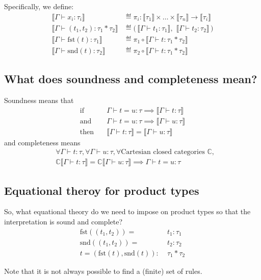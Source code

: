 Specifically, we define:
\begin{align*}
    \llbracket \Gamma \vdash x_i : \tau_i \rrbracket &\eqdef
    \pi_i : \llbracket \tau_1 \rrbracket \times \ldots \times \llbracket \tau_n
    \rrbracket \rightarrow \llbracket \tau_i \rrbracket
    \\
    \llbracket \Gamma \vdash (t_1, t_2) : \tau_1 \ast \tau_2 \rrbracket &\eqdef
    \big(\,\llbracket \Gamma \vdash t_1 : \tau_1 \rrbracket,\,\,
           \llbracket \Gamma \vdash t_2 : \tau_2 \rrbracket\,\big)
    \\
    \llbracket \Gamma \vdash \text{fst}(t) : \tau_1 \rrbracket &\eqdef
    \pi_1 \circ \llbracket \Gamma \vdash t : \tau_1 \ast \tau_2 \rrbracket
    \\
    \llbracket \Gamma \vdash \text{snd}(t) : \tau_2 \rrbracket &\eqdef
    \pi_2 \circ \llbracket \Gamma \vdash t : \tau_1 \ast \tau_2 \rrbracket
\end{align*}

\subsection{What does soundness and completeness mean?}

Soundness means that
\begin{align*}
    \text{if}\quad& \Gamma \vdash t = u : \tau \implies \llbracket \Gamma \vdash t
    : \tau \rrbracket
    \\
    \text{and}\quad& \Gamma \vdash t = u : \tau \implies \llbracket \Gamma \vdash u
    : \tau \rrbracket
    \\
    \text{then}\quad& \llbracket \Gamma \vdash t : \tau \rrbracket = \llbracket
    \Gamma \vdash u : \tau \rrbracket
\end{align*}
and completeness means
\begin{align*}
    &\forall \Gamma \vdash t : \tau, \forall \Gamma \vdash u : \tau, \forall
    \text{Cartesian closed categories } \mathbb{C},
    \\
    &\mathbb{C}\llbracket \Gamma \vdash t : \tau \rrbracket =
    \mathbb{C}\llbracket \Gamma \vdash u : \tau \rrbracket \implies
    \Gamma \vdash t = u : \tau
\end{align*}

\subsection{Equational theroy for product types}

So, what equational theory do we need to impose on product types so that the
interpretation is sound and complete?
\begin{align*}
    \text{fst}((t_1, t_2)) =\; &t_1 : \tau_1
    \\
    \text{snd}((t_1, t_2)) =\; &t_2 : \tau_2
    \\
    t = (\text{fst}(t), \text{snd}(t)) :\; &\tau_1 \ast \tau_2
\end{align*}

Note that it is not always possible to find a (finite) set of rules.
